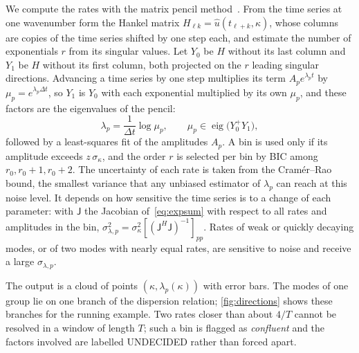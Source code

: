 \documentclass[11pt]{article}
\theoremstyle{plain}
\theoremstyle{definition}
\theoremstyle{remark}
\newcommand{\sigbin}{\sigma_{\kappa}}       %
\newcommand{\lab}[1]{\textsf{#1}}           %
\newcommand{\UND}{\lab{UNDECIDED}}
\begin{document}
We compute the rates with the matrix pencil method~\cite{HuaSar90}. From the time series at one wavenumber form the Hankel matrix $H_{\ell k}=\hat u(t_{\ell+k},\kappa)$, whose columns are copies of the time series shifted by
one step each, and estimate the number of exponentials $r$ from its singular values. Let $Y_0$ be $H$ without its last
column and $Y_1$ be $H$ without its first column, both projected on the $r$ leading singular directions. Advancing a
time series by one step multiplies its term $A_pe^{\lambda_pt}$ by $\mu_p=e^{\lambda_p\Delta t}$, so $Y_1$ is $Y_0$ with
each exponential multiplied by its own $\mu_p$, and these factors are the eigenvalues of the pencil:
\begin{equation}\label{eq:pencil}
  \lambda_p=\frac{1}{\Delta t}\log\mu_p,\qquad \mu_p\in\operatorname{eig}\big(Y_0^{+}Y_1\big),
\end{equation}
followed by a least-squares fit of the amplitudes $A_p$. A bin is used only if its amplitude exceeds
$z\,\sigbin$, and the order $r$ is selected per bin by BIC among $r_0,r_0+1,r_0+2$. The uncertainty of each rate is
taken from the Cram\'er--Rao bound, the smallest variance that any unbiased estimator of $\lambda_p$ can reach at this
noise level. It depends on how sensitive the time series is to a change of each parameter: with $\mathsf J$ the
Jacobian of~\eqref{eq:expsum} with respect to all rates and amplitudes in the bin,
$\sigma_{\lambda,p}^2=\sigbin^2[(\mathsf J^H\mathsf J)^{-1}]_{pp}$. Rates of weak or quickly decaying modes, or of two modes with
nearly equal rates, are sensitive to noise and receive a large $\sigma_{\lambda,p}$.

The output is a cloud of points $(\kappa,\lambda_p(\kappa))$ with error bars. The modes of one group lie
on one branch of the dispersion relation; \cref{fig:directions} shows these branches for the
running example. Two rates closer than about $4/T$ cannot be resolved in a window of length $T$; such
a bin is flagged as \emph{confluent} and the factors involved are labelled \UND{} rather than forced
apart.
\end{document}
